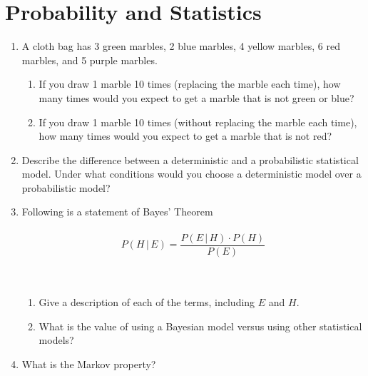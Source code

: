 \documentclass{article}
\begin{document}
\section{Probability and Statistics}
\begin{enumerate}[\thesection .1]
\item A cloth bag has 3 green marbles, 2 blue marbles, 4 yellow marbles, 6 red marbles, and 5 purple marbles.
  \begin{enumerate}
  \item If you draw 1 marble 10 times (replacing the marble each time), how many times would you expect to get a marble that is not green or blue?
  \item If you draw 1 marble 10 times (without replacing the marble each time), how many times would you expect to get a marble that is not red?
  \end{enumerate}

\item
  Describe the difference between a deterministic and a probabilistic statistical model. Under what conditions would you choose a deterministic model over a probabilistic model?

\item Following is a statement of Bayes' Theorem \\ \\
  \begin{equation*}
    P(H \, \vert \, E) = \frac {P(E \, \vert \, H) \cdot P(H)}{P(E)}
  \end{equation*} \\ \\
  \begin{enumerate}
  \item Give a description of each of the terms, including $E$ and $H$.
  \item What is the value of using a Bayesian model versus using other statistical models?
  \end{enumerate}

\item What is the Markov property?

\end{enumerate}

\end{document}
